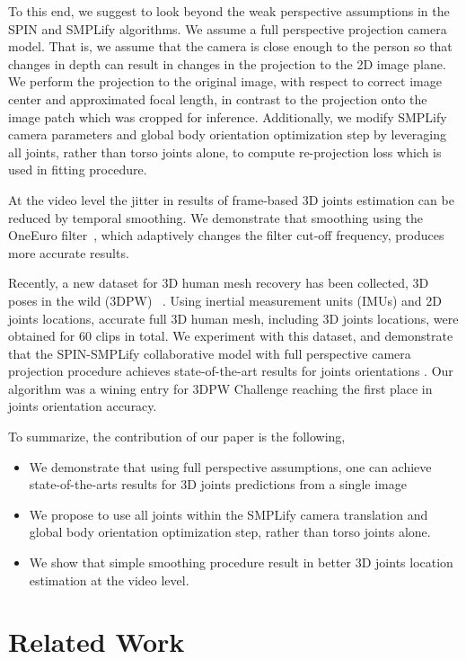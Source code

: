 \documentclass[runningheads]{llncs}
\begin{document}
To this end, we suggest to look beyond the weak perspective assumptions in the SPIN and SMPLify algorithms. We assume a full perspective projection camera model. That is, we assume that the camera is close enough to the person so that changes in depth can result in changes in the projection to the 2D image plane. We perform the projection to the original image, with respect to correct image center and approximated focal length, in contrast to the projection onto the image patch which was cropped for inference.  Additionally, we modify SMPLify camera parameters and global body orientation optimization step by leveraging all joints, rather than torso joints alone,  to compute re-projection loss which is used in fitting procedure. 

At the video level the jitter in results of frame-based 3D joints estimation can be reduced by temporal smoothing. We demonstrate that smoothing using the OneEuro filter~\cite{casiez20121}, which adaptively changes the filter cut-off frequency, produces more accurate results.

Recently, a new dataset for 3D human mesh recovery has been collected, 3D poses in the wild (3DPW) ~\cite{vonMarcard2018}. Using inertial measurement units (IMUs) and 2D joints locations, accurate full 3D human mesh, including 3D joints locations, were obtained for 60 clips in total. We experiment with this dataset, and demonstrate that the SPIN-SMPLify collaborative model with full perspective camera projection procedure achieves state-of-the-art results for joints orientations . Our algorithm was a wining entry for 3DPW Challenge reaching the first place in joints orientation accuracy.   



To summarize, the contribution of our paper is the following,
\begin{itemize}
	\item We demonstrate that using full perspective assumptions, one can achieve state-of-the-arts results for 3D joints predictions from a single image
	\item We propose to use all joints within the SMPLify camera translation and global body orientation optimization step, rather than torso joints alone.   
\item We show that simple smoothing procedure result in better 3D joints location estimation at the video level.
\end{itemize}

\section{Related Work}
\end{document}
